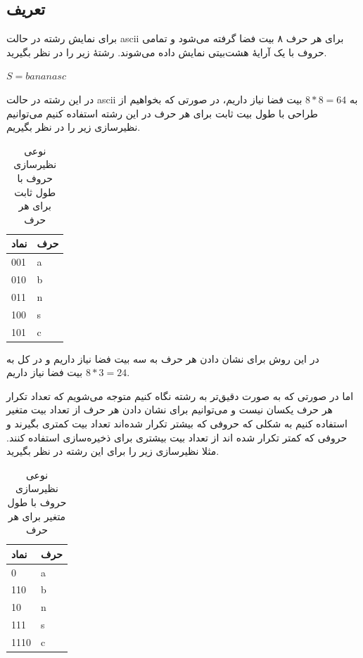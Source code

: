 \subsection{تعریف}
برای نمایش رشته در حالت 
ascii 
برای هر حرف ۸ بیت فضا گرفته می‌شود و تمامی حروف با یک آرایهٔ هشت‌بیتی
نمایش داده می‌شوند. رشتهٔ زیر را در نظر بگیرید.
\begin{center}
        $S = bananasc$
\end{center}

در این رشته در حالت ascii به 
$ 8 * 8 = 64$ 
بیت فضا نیاز داریم، در صورتی که بخواهیم از طراحی 
با طول بیت ثابت برای هر حرف در این رشته استفاده کنیم می‌توانیم نظیرسازی 
زیر را در نظر بگیریم. 

\begin{table}[h]
        \centering
        \caption{نوعی نظیرسازی حروف با طول ثابت برای هر حرف}
        \label{huffman}
        \begin{tabular}{ll}
        \hline
        نماد & حرف \\ \hline
        001 & a \\
        010 & b \\
        011 & n \\
        100 & s \\
        101 & c \\ \hline
        \end{tabular}
\end{table}

در این روش برای نشان دادن هر حرف به سه بیت فضا نیاز داریم و در کل به
$ 8 * 3 = 24 $
بیت فضا نیاز داریم. 

اما در صورتی که به صورت دقیق‌تر به رشته نگاه کنیم متوجه می‌شویم که تعداد تکرار هر حرف
یکسان نیست و می‌توانیم برای نشان دادن هر حرف از تعداد بیت متغیر استفاده کنیم به شکلی که 
حروفی که بیشتر تکرار شده‌اند تعداد بیت کمتری بگیرند و حروفی که کمتر تکرار
شده اند از تعداد بیت بیشتری برای ذخیره‌‌سازی استفاده کنند. مثلا نظیرسازی زیر 
را برای این رشته در نظر بگیرید.

\begin{table}[h]
        \centering
        \caption{نوعی نظیرسازی حروف با طول متغیر برای هر حرف}
        \label{huffman}
        \begin{tabular}{ll}
        \hline
        نماد & حرف \\ \hline
        0 & a \\
        110 & b \\
        10 & n \\
        111 & s \\
        1110 & c \\ \hline
        \end{tabular}
\end{table}

